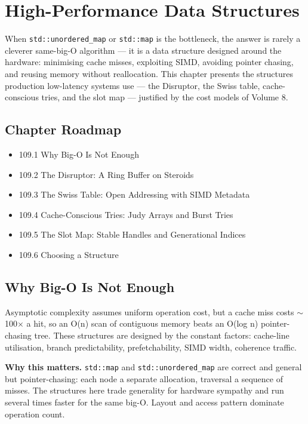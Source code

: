 \chapter{High-Performance Data Structures}

When \texttt{std::unordered\_map} or \texttt{std::map} is the bottleneck, the answer is rarely a cleverer same-big-O algorithm --- it is a data structure designed around the hardware: minimising cache misses, exploiting SIMD, avoiding pointer chasing, and reusing memory without reallocation. This chapter presents the structures production low-latency systems use --- the Disruptor, the Swiss table, cache-conscious tries, and the slot map --- justified by the cost models of Volume 8.

\section*{Chapter Roadmap}
\begin{itemize}
\item 109.1 Why Big-O Is Not Enough
\item 109.2 The Disruptor: A Ring Buffer on Steroids
\item 109.3 The Swiss Table: Open Addressing with SIMD Metadata
\item 109.4 Cache-Conscious Tries: Judy Arrays and Burst Tries
\item 109.5 The Slot Map: Stable Handles and Generational Indices
\item 109.6 Choosing a Structure
\end{itemize}

\section{Why Big-O Is Not Enough}
Asymptotic complexity assumes uniform operation cost, but a cache miss costs $\sim$100$\times$ a hit, so an O(n) scan of contiguous memory beats an O(log n) pointer-chasing tree. These structures are designed by the constant factors: cache-line utilisation, branch predictability, prefetchability, SIMD width, coherence traffic.

\textbf{Why this matters.} \texttt{std::map} and \texttt{std::unordered\_map} are correct and general but pointer-chasing: each node a separate allocation, traversal a sequence of misses. The structures here trade generality for hardware sympathy and run several times faster for the same big-O. Layout and access pattern dominate operation count.

